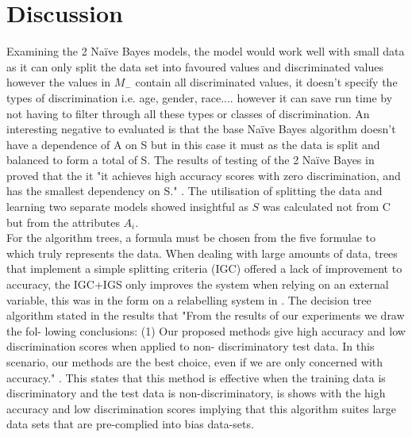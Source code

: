 \section{Discussion}
\label{Discussion Section}

Examining the 2 Naïve Bayes models, the model would work well with small data as it can only split the data set into favoured values and discriminated values however the values in $M_-$ contain all discriminated values, it doesn't specify the types of discrimination i.e. age, gender, race.... however it can save run time by not having to filter through all these types or classes of discrimination. An interesting negative to evaluated is that the base Naïve Bayes algorithm doesn't have a dependence of A on S but in this case it must as the data is split and balanced to form a total of S. The results of testing of the 2 Naïve Bayes in \cite{Naive} proved that the it "it achieves high accuracy scores with zero discrimination, and has the smallest dependency on S." \cite{Naive}. The utilisation of splitting the data and learning two separate models showed insightful as $S$ was calculated not from C but from the attributes $A_i$. \\

For the algorithm trees, a formula must be chosen from the five formulae to which truly represents the data. When dealing with large amounts of data, trees that implement a simple splitting criteria (IGC) offered a lack of improvement to accuracy, the IGC+IGS only improves the system when relying on an external variable, this was in the form on a relabelling system in \cite{Tree}. The decision tree algorithm stated in the results that "From the results of our experiments we draw the fol- lowing conclusions: (1) Our proposed methods give high accuracy and low discrimination scores when applied to non- discriminatory test data. In this scenario, our methods are the best choice, even if we are only concerned with accuracy." \cite{Tree}. This states that this method is effective when the training data is discriminatory and the test data is non-discriminatory, is shows with the high accuracy and low discrimination scores implying that this algorithm suites large data sets that are pre-complied into bias data-sets. \\